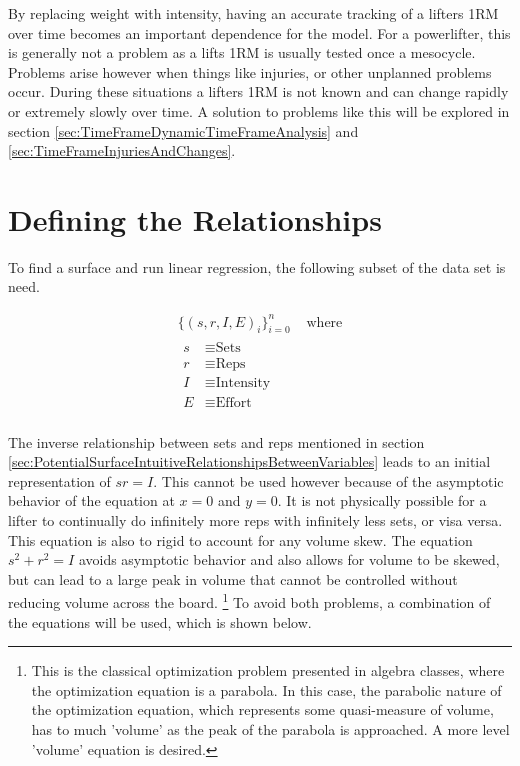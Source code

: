 By replacing weight with intensity, having an accurate tracking of a lifters 1RM over time becomes an important dependence for the model. For a powerlifter, this is generally not a problem as a lifts 1RM is usually tested once a mesocycle. Problems arise however when things like injuries, or other unplanned problems occur. During these situations a lifters 1RM is not known and can change rapidly or extremely slowly over time. A solution to problems like this will be explored in section \ref{sec:TimeFrameDynamicTimeFrameAnalysis} and \ref{sec:TimeFrameInjuriesAndChanges}.

\section{Defining the Relationships}
\label{sec:PotentialSurfaceDefiningTheRelationships}

To find a surface and run linear regression, the following subset of the data set is need.

\begin{equation}
    \label{eq:UserDataSet}
    \begin{split}
        \{(s,r,I,E)_i\}_{i=0}^n & \text{  where}\\
        \begin{split}
            s&\equiv \text{Sets} \\
            r&\equiv \text{Reps} \\
            I&\equiv \text{Intensity} \\
            E&\equiv \text{Effort} \\
        \end{split}
    \end{split}
\end{equation}

The inverse relationship between sets and reps mentioned in section \ref{sec:PotentialSurfaceIntuitiveRelationshipsBetweenVariables} leads to an initial representation of $sr=I$. This cannot be used however because of the asymptotic behavior of the equation at $x=0$ and $y=0$. It is not physically possible for a lifter to continually do infinitely more reps with infinitely less sets, or visa versa. This equation is also to rigid to account for any volume skew. The equation $s^2+r^2=I$ avoids asymptotic behavior and also allows for volume to be skewed, but can lead to a large peak in volume that cannot be controlled without reducing volume across the board. \footnote{This is the classical optimization problem presented in algebra classes, where the optimization equation is a parabola. In this case, the parabolic nature of the optimization equation, which represents some quasi-measure of volume, has to much 'volume' as the peak of the parabola is approached. A more level 'volume' equation is desired.} To avoid both problems, a combination of the equations will be used, which is shown below.

